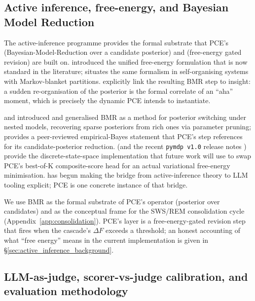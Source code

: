\subsection{Active inference, free-energy, and Bayesian Model Reduction}

The active-inference programme provides the formal substrate that PCE's  (Bayesian-Model-Reduction over a candidate posterior) and  (free-energy gated revision) are built on. \citet{Friston2010FreeEnergyUnifiedBrainTheory} introduced the unified free-energy formulation that is now standard in the literature; \citet{Friston2013LifeAsWeKnowItJRSAInterface} situates the same formalism in self-organising systems with Markov-blanket partitions. \citet{Friston2017ActiveInferenceCuriosity} explicitly link the resulting BMR step to insight: a sudden re-organisation of the posterior is the formal correlate of an ``aha'' moment, which is precisely the dynamic PCE intends to instantiate.

\citet{FristonPenny2011} and \citet{Friston2018BayesianModelReductionArxiv} introduced and generalised BMR as a method for posterior switching under nested models, recovering sparse posteriors from rich ones via parameter pruning; \citet{FristonEtAl2016BayesianModelReductionEmpiricalBayesDCM} provides a peer-reviewed empirical-Bayes statement that PCE's  step references for its candidate-posterior reduction. \citet{Heins2022pymdp} (and the recent \texttt{pymdp v1.0} release notes \citep{pymdpRelease100}) provide the discrete-state-space implementation that future work will use to swap PCE's best-of-K composite-score head for an actual variational free-energy minimisation. \citet{DiPaoloEtAl2024OSFActiveInferenceSchool} has begun making the bridge from active-inference theory to LLM tooling explicit; PCE is one concrete instance of that bridge.

We use BMR as the formal substrate of PCE's  operator (posterior over candidates) and as the conceptual frame for the SWS/REM consolidation cycle (Appendix~\ref{app:consolidation}). PCE's  layer is a free-energy-gated revision step that fires when the cascade's $\Delta F$ exceeds a threshold; an honest accounting of what ``free energy'' means in the current implementation is given in \S\ref{sec:active_inference_background}.

\subsection{LLM-as-judge, scorer-vs-judge calibration, and evaluation methodology}

